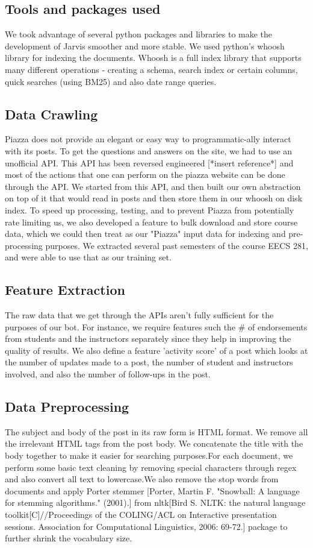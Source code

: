 \documentclass[sigconf]{acmart}
\begin{document}
\subsection{Tools and packages used}
We took advantage of several python packages and libraries to make the development of Jarvis smoother and more stable. We used python's whoosh library for indexing the documents. Whoosh is a full index library that supports many different operations - creating a schema, search index or certain columns, quick searches (using BM25) and also date range queries. 

\subsection{Data Crawling}
Piazza does not provide an elegant or easy way to programmatic-ally interact with its posts. To get the questions and answers on the site, we had to use an unofficial API. This API has been reversed engineered [*insert reference*] and most of the actions that one can perform on the piazza website can be done through the API. We started from this API, and then built our own abstraction on top of it that would read in posts and then store them in our whoosh on disk index. To speed up processing, testing, and to prevent Piazza from potentially rate limiting us, we also developed a feature to bulk download and store course data, which we could then treat as our "Piazza" input data for indexing and pre-processing purposes. We extracted several past semesters of the course EECS 281, and were able to use that as our training set.


\subsection{Feature Extraction}
The raw data that we get through the APIs aren't fully sufficient for the purposes of our bot. For instance, we require features such the \# of endorsements from students and the instructors separately since they help in improving the quality of results. We also define a feature 'activity score' of a post which looks at the number of updates made to a post, the number of student and instructors involved, and also the number of follow-ups in the post.

\subsection{Data Preprocessing}
The subject and body of the post in its raw form is HTML format. We remove all the irrelevant HTML tags from the post body. We concatenate the title with the body together to make it easier for searching purposes.For each document, we perform some basic text cleaning by removing special characters through regex and also convert all text to lowercase.We also remove the stop words from documents and apply Porter stemmer [Porter, Martin F. "Snowball: A language for stemming algorithms." (2001).] from nltk[Bird S. NLTK: the natural language toolkit[C]//Proceedings of the COLING/ACL on Interactive presentation sessions. Association for Computational Linguistics, 2006: 69-72.] package to further shrink the vocabulary size. 
\end{document}
